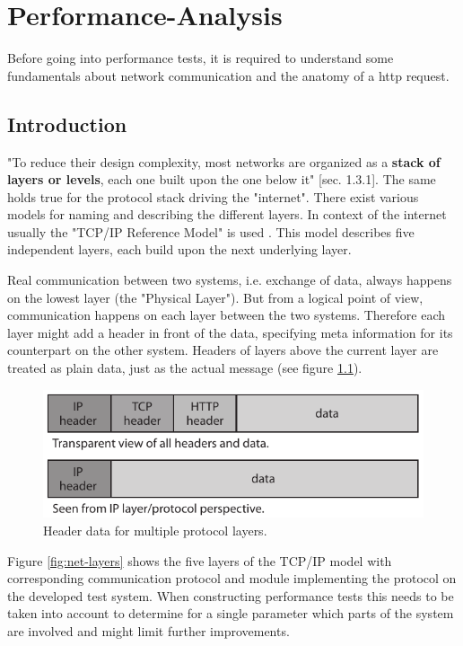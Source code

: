 \chapter{Performance-Analysis}

Before going into performance tests, it is required to understand some fundamentals about network communication and the anatomy of a \gls{http} request.

\section{Introduction}

"To reduce their design complexity, most networks are organized as a \textbf{stack of layers or levels}, each one built upon the one below it" \cite{kn1}[sec. 1.3.1]. The same holds true for the protocol stack driving the "internet". There exist various models for naming and describing the different layers. In context of the internet usually the "TCP/IP Reference Model" is used \cite{kn1}. This model describes five independent layers, each build upon the next underlying layer. 

Real communication between two systems, i.e. exchange of data, always happens on the lowest layer (the "Physical Layer"). But from a logical point of view, communication happens on each layer between the two systems. Therefore each layer might add a header in front of the data, specifying meta information for its counterpart on the other system. Headers of layers above the current layer are treated as plain data, just as the actual message (see figure \ref{fig:header-layers}).

\begin{figure}[H]
	\centering
	\includegraphics[scale=1]{images/protocol-headers.pdf}
	\caption{Header data for multiple protocol layers.}
	\label{fig:header-layers}
\end{figure}

Figure \ref{fig:net-layers} shows the five layers of the TCP/IP model with corresponding communication protocol and module implementing the protocol on the developed test system. When constructing performance tests this needs to be taken into account to determine for a single parameter which parts of the system are involved and might limit further improvements.

